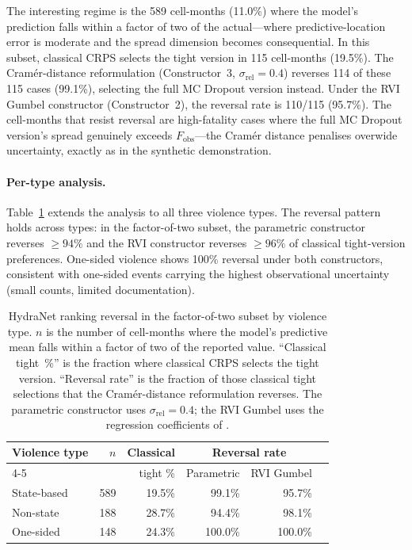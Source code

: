 The interesting regime is the 589 cell-months (11.0\%) where the model's prediction falls within a factor of two of the actual---where predictive-location error is moderate and the spread dimension becomes consequential. In this subset, classical CRPS selects the tight version in 115 cell-months (19.5\%). The Cram\'er-distance reformulation (Constructor~3, $\sigma_\text{rel} = 0.4$) reverses 114 of these 115 cases (99.1\%), selecting the full MC Dropout version instead. Under the RVI Gumbel constructor (Constructor~2), the reversal rate is 110/115 (95.7\%). The cell-months that resist reversal are high-fatality cases where the full MC Dropout version's spread genuinely exceeds $F_\text{obs}$---the Cram\'er distance penalises overwide uncertainty, exactly as in the synthetic demonstration.

\paragraph{Per-type analysis.}
Table~\ref{tab:hydranet_reversal} extends the analysis to all three violence types. The reversal pattern holds across types: in the factor-of-two subset, the parametric constructor reverses $\geq 94\%$ and the RVI constructor reverses $\geq 96\%$ of classical tight-version preferences. One-sided violence shows 100\% reversal under both constructors, consistent with one-sided events carrying the highest observational uncertainty (small counts, limited documentation).

\begin{table}[h]
    \centering
    \small
    \begin{tabular}{lrrrrr}
        \toprule
        Violence type & $n$ & Classical & \multicolumn{2}{c}{Reversal rate} \\
        \cmidrule(lr){4-5}
         & & tight \% & Parametric & RVI Gumbel \\
        \midrule
        State-based & 589 & 19.5\% & 99.1\% & 95.7\% \\
        Non-state & 188 & 28.7\% & 94.4\% & 98.1\% \\
        One-sided & 148 & 24.3\% & 100.0\% & 100.0\% \\
        \bottomrule
    \end{tabular}
    \caption{HydraNet ranking reversal in the factor-of-two subset by violence type. $n$ is the number of cell-months where the model's predictive mean falls within a factor of two of the reported value. ``Classical tight~\%'' is the fraction where classical CRPS selects the tight version. ``Reversal rate'' is the fraction of those classical tight selections that the Cram\'er-distance reformulation reverses. The parametric constructor uses $\sigma_\text{rel} = 0.4$; the RVI Gumbel uses the regression coefficients of \citet{vesco2026uncertainty}.}
    \label{tab:hydranet_reversal}
\end{table}

